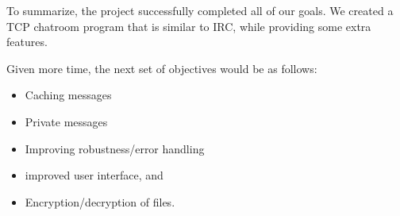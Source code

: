 \documentclass{article}
\begin{document}
To summarize, the project successfully completed all of our goals. We created a TCP chatroom program that is similar to IRC, while providing some extra features. 

Given more time, the next set of objectives would be as follows: 
\begin{itemize}
  \item Caching messages
  \item Private messages
  \item Improving robustness/error handling
  \item improved user interface, and
  \item Encryption/decryption of files. 
\end{itemize}








\end{document}
